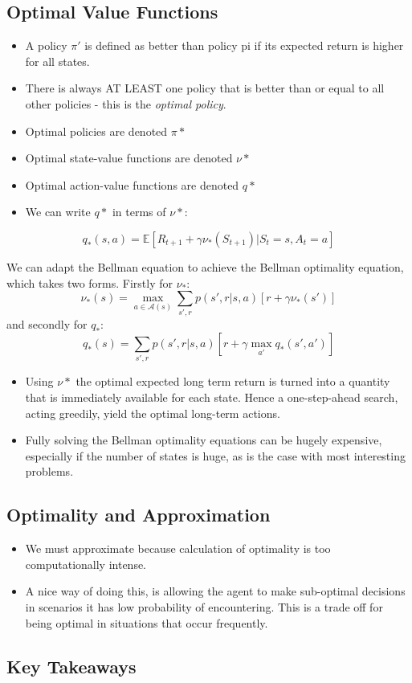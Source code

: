 \subsection{Optimal Value Functions}
\begin{itemize}
\item A policy \(\pi '\) is defined as better than policy pi if its expected return is higher for all states.
\item There is always AT LEAST one policy that is better than or equal to all other policies - this is the \textit{optimal policy}.
\item Optimal policies are denoted \(\pi*\)
\item Optimal state-value functions are denoted \(\nu*\)
\item Optimal action-value functions are denoted \(q*\)
\item We can write \(q*\) in terms of \(\nu*\):
\end{itemize}

\begin{equation}
q_*(s,a) = \mathbb{E} \left[R_{t+1} + \gamma \nu_*(S_{t+1}) | S_t = s, A_t = a \right]
\end{equation}

We can adapt the Bellman equation to achieve the Bellman optimality equation, which takes two forms. Firstly for \(\nu_*\):
\begin{equation}
\nu_*(s) = \max_{a \in \mathcal{A}(s)} \sum_{s',r} p(s', r | s, a) \left[r + \gamma \nu_*(s')\right]
\end{equation}
and secondly for \(q_*\):
\begin{equation}
q_*(s) = \sum_{s',r} p(s', r | s, a) \left[r + \gamma \max_{a'} q_*(s', a') \right]
\end{equation}

\begin{itemize}
\item Using \(\nu*\) the optimal expected long term return is turned into a quantity that is immediately available for each state. Hence a one-step-ahead search, acting greedily, yield the optimal long-term actions.
\item Fully solving the Bellman optimality equations can be hugely expensive, especially if the number of states is huge, as is the case with most interesting problems.
\end{itemize}

\subsection{Optimality and Approximation}
\begin{itemize}
	\item We must approximate because calculation of optimality is too computationally intense.
	\item A nice way of doing this, is allowing the agent to make sub-optimal decisions in scenarios it has low probability of encountering. This is a trade off for being optimal in situations that occur frequently.
\end{itemize}

\subsection{Key Takeaways}




